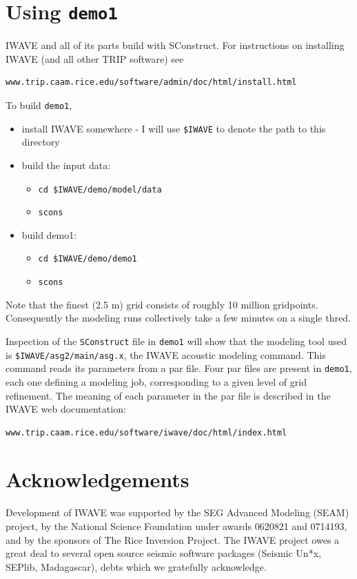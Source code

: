 \documentclass [12pt]{georeport}
\begin{document}
\section{Using {\tt demo1}}
IWAVE and all of its parts build with SConstruct. For instructions on
installing IWAVE (and all other TRIP software) see 
\begin{verbatim}
www.trip.caam.rice.edu/software/admin/doc/html/install.html
\end{verbatim}

To build {\tt demo1},
\begin{itemize}
\item install IWAVE somewhere - I will use  {\tt \$IWAVE} to denote
  the path to this directory  
\item build the input data:
\begin{itemize} 
  \item {\tt cd \$IWAVE/demo/model/data}
\item {\tt scons}
\end{itemize}
\item build demo1:
\begin{itemize}
\item {\tt cd \$IWAVE/demo/demo1}
\item {\tt scons}
\end{itemize}
\end{itemize}
Note that the finest (2.5 m) grid consists of roughly 10 million
gridpoints. Consequently the modeling runs collectively take a few
minutes on a single thred.

Inspection of the {\tt SConstruct} file in {\tt demo1} will show that
the modeling tool used is {\tt \$IWAVE/asg2/main/asg.x}, the IWAVE
acoustic modeling command. This command reads its parameters from a
par file. Four par files are present in {\tt demo1}, each one defining
a modeling job, corresponding to a given level of grid refinement. The
meaning of each parameter in the par file is described in the IWAVE
web documentation:

\begin{verbatim}
www.trip.caam.rice.edu/software/iwave/doc/html/index.html
\end{verbatim}

\section{Acknowledgements}
Development of IWAVE was supported by the SEG Advanced Modeling (SEAM) project, by the National Science Foundation under awards 0620821 and 0714193, and by the sponsors of The Rice Inversion Project. The IWAVE project owes a great deal to several open source seismic software packages (Seismic Un*x, SEPlib, Madagascar), debts which we gratefully acknowledge. 


\end{document}
